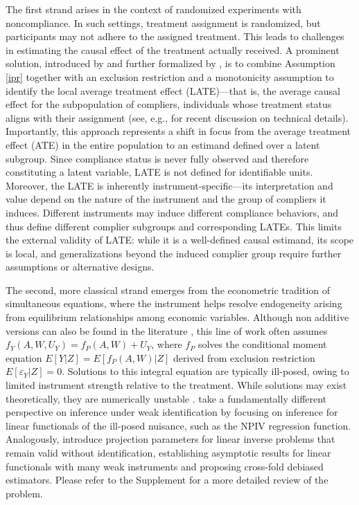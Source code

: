 \documentclass[12pt]{article}
\theoremstyle{thmstyleone}%
\theoremstyle{thmstyletwo}%
\theoremstyle{thmstylethree}%
\begin{document}
The first strand arises in the context of randomized experiments with noncompliance. In such settings, treatment assignment is randomized, but participants may not adhere to the assigned treatment. This leads to challenges in estimating the causal effect of the treatment actually received. A prominent solution, introduced by \citep{imbens} and further formalized by \citep{angrist1996identification}, is to combine Assumption \ref{ipr} together with an exclusion restriction and a monotonicity assumption to identify the local average treatment effect (LATE)---that is, the average causal effect for the subpopulation of compliers, individuals whose treatment status aligns with their assignment (see, e.g., \citep{tchetgen2024} for recent discussion on technical details). Importantly, this approach represents a shift in focus from the average treatment effect (ATE) in the entire population to an estimand defined over a latent subgroup. Since compliance status is never fully observed and therefore constituting a latent variable, LATE is not defined for identifiable units. Moreover, the LATE is inherently instrument-specific---its interpretation and value depend on the nature of the instrument and the group of compliers it induces. Different instruments may induce different compliance behaviors, and thus define different complier subgroups and corresponding LATEs. This limits the external validity of LATE: while it is a well-defined causal estimand, its scope is local, and generalizations beyond the induced complier group require further assumptions or alternative designs.


The second, more classical strand emerges from the econometric tradition of simultaneous equations, where the instrument helps resolve endogeneity arising from equilibrium relationships among economic variables.
Although non additive versions can also be found in the literature \citep{matzkin2003nonparametric, imbens2009identification}, this line of work often assumes $f_Y(A,W,U_Y) = f_P(A,W) + U_Y$, where $f_P$ solves the conditional moment equation $E [Y | Z]= E [f_P(A,W) | Z]$ derived from exclusion restriction $E [\varepsilon_Y | Z] = 0$. Solutions to this integral equation are typically ill-posed, owing to limited instrument strength relative to the treatment. While solutions may exist theoretically, they are numerically unstable \citep{darolles}. \citet{neweak} take a fundamentally different perspective on inference under weak identification by focusing on inference for linear functionals of the ill-posed nuisance, such as the NPIV regression function. Analogously, \citet{vanderlaan2025nonparametricinstrumentalvariableinference} introduce projection parameters for linear inverse problems that remain valid without identification, establishing asymptotic results for linear functionals with many weak instruments and proposing cross-fold debiased estimators. Please refer to the Supplement for a more detailed review of the problem. 
\end{document}
